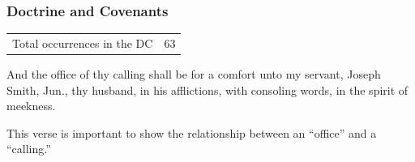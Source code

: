 		
	
		
		
	\subsubsection{Doctrine and Covenants} %
		\label{OFFICE-DC}
	
		\begin{tabular}{ll}
			Total occurrences in the DC & 63
		\end{tabular}
		
		\begin{compactdesc}
			\item[{\hyperref[DC25-5]{DC 25:5}}] And the office of thy calling shall be for a comfort unto my servant, Joseph Smith, Jun., thy husband, in his afflictions, with consoling words, in the spirit of meekness.
				\begin{compactitem}
					\item This verse is important to show the relationship between an ``office'' and a ``calling.''
				\end{compactitem}
		\end{compactdesc}
		
	
